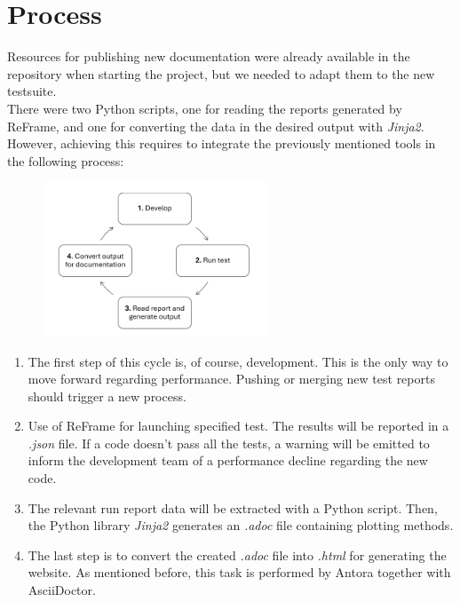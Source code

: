\documentclass[12pt]{article}
\begin{document}
\newpage
\section{Process}
Resources for publishing new documentation were already available in the repository when starting the project, but we needed to adapt them to the new testsuite.\\
There were two Python scripts, one for reading the reports generated by ReFrame, and one for converting the data in the desired output with \textit{Jinja2}. \\
However, achieving this requires to integrate the previously mentioned tools in the following process:

\begin{figure}[H]
    \centering
    \includegraphics[width=0.6\textwidth]{../illustrations/process.png}
\end{figure}

\begin{enumerate}
    \item The first step of this cycle is, of course, development. This is the only way to move forward regarding performance. Pushing or merging new test reports should trigger a new process.
    \item Use of ReFrame for launching specified test. The results will be reported in a \textit{.json} file. If a code doesn't pass all the tests, a warning will be emitted to inform the development team of a performance decline regarding the new code.
    \item The relevant run report data will be extracted with a Python script. Then, the Python library \textit{Jinja2}\cite*{Jinja2}  generates an \textit{.adoc} file containing plotting methods.
    \item The last step is to convert the created \textit{.adoc} file into \textit{.html} for generating the website. As mentioned before, this task is performed by Antora together with AsciiDoctor.
\end{enumerate}
\end{document}
